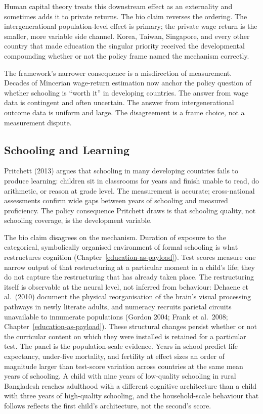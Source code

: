 \documentclass[12pt,letterpaper]{article}
\begin{document}
{Human capital theory treats this downstream effect as an externality and sometimes adds it to private returns. The bio claim reverses the ordering. The intergenerational population-level effect is primary; the private wage return is the smaller, more variable side channel. Korea, Taiwan, Singapore, and every other country that made education the singular priority received the developmental compounding whether or not the policy frame named the mechanism correctly.

The framework's narrower consequence is a misdirection of measurement. Decades of Mincerian wage-return estimation now anchor the policy question of whether schooling is ``worth it'' in developing countries. The answer from wage data is contingent and often uncertain. The answer from intergenerational outcome data is uniform and large. The disagreement is a frame choice, not a measurement dispute.

\subsection{Schooling and Learning}\label{schooling-and-learning}

Pritchett (2013) argues that schooling in many developing countries fails to produce learning: children sit in classrooms for years and finish unable to read, do arithmetic, or reason at grade level. The measurement is accurate; cross-national assessments confirm wide gaps between years of schooling and measured proficiency. The policy consequence Pritchett draws is that schooling quality, not schooling coverage, is the development variable.

The bio claim disagrees on the mechanism. Duration of exposure to the categorical, symbolically organised environment of formal schooling is what restructures cognition (Chapter~\ref{education-as-payload}). Test scores measure one narrow output of that restructuring at a particular moment in a child's life; they do not capture the restructuring that has already taken place. The restructuring itself is observable at the neural level, not inferred from behaviour: Dehaene et al.\ (2010) document the physical reorganisation of the brain's visual processing pathways in newly literate adults, and numeracy recruits parietal circuits unavailable to innumerate populations (Gordon 2004; Frank et al.\ 2008; Chapter~\ref{education-as-payload}). These structural changes persist whether or not the curricular content on which they were installed is retained for a particular test. The panel is the population-scale evidence. Years in school predict life expectancy, under-five mortality, and fertility at effect sizes an order of magnitude larger than test-score variation across countries at the same mean years of schooling. A child with nine years of low-quality schooling in rural Bangladesh reaches adulthood with a different cognitive architecture than a child with three years of high-quality schooling, and the household-scale behaviour that follows reflects the first child's architecture, not the second's score.

}
\end{document}
